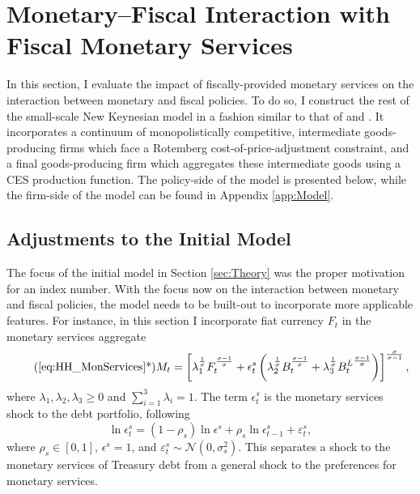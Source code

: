 \documentclass[11pt,a4paper,margin=1.5in]{article}
\begin{document}
\section{Monetary--Fiscal Interaction with Fiscal Monetary Services}
\label{sec:MonetaryFiscal}
In this section, I evaluate the impact of fiscally-provided monetary services on the interaction between monetary and fiscal policies.
To do so, I construct the rest of the small-scale New Keynesian model in a fashion similar to that of \citet{Ireland:2004} and \citet{Belongia-Ireland:2014}.
It incorporates a continuum of monopolistically competitive, intermediate goods-producing firms which face a Rotemberg cost-of-price-adjustment constraint, and a final goods-producing firm which aggregates these intermediate goods using a CES production function. 
The policy-side of the model is presented below, while the firm-side of the model can be found in Appendix \ref{app:Model}.

\subsection{Adjustments to the Initial Model}
The focus of the initial model in Section \ref{sec:Theory} was the proper motivation for an index number.
With the focus now on the interaction between monetary and fiscal policies, the model needs to be built-out to incorporate more applicable features.
For instance, in this section I incorporate fiat currency $F_t$ in the monetary services aggregate
\begin{equation} \tag{\ref{eq:HH_MonServices}*}
	M_t = \left[\lambda_1^{\frac{1}{\sigma}}F_t^{\frac{\sigma-1}{\sigma}} +
			\epsilon^s_t\left( \lambda_2^{\frac{1}{\sigma}}B_t^{\frac{\sigma-1}{\sigma}} + 
			 \lambda_3^{\frac{1}{\sigma}}{B^L_t}^{\frac{\sigma-1}{\sigma}}\right)\right]^{\frac{\sigma}{\sigma-1}},
	\label{eq:AltMonetaryServices}
\end{equation}
where $\lambda_1, \lambda_2, \lambda_3 \geq 0$ and $\sum_{i=1}^3 \lambda_i = 1$.
The term $\epsilon^s_t$ is the monetary services shock to the debt portfolio, following 
\begin{equation}
	\ln\epsilon^s_t = (1-\rho_s)\ln\epsilon^s + \rho_s\ln\epsilon^s_{t-1} + \varepsilon^s_t,
	\label{eq:MonServicesShock}
\end{equation}
where $\rho_s \in[0,1]$, $\epsilon^s = 1$, and $\varepsilon^s_t \sim \mathcal{N}(0,\sigma_s^2)$. 
This separates a shock to the monetary services of Treasury debt from a general shock to the preferences for monetary services.
\end{document}
